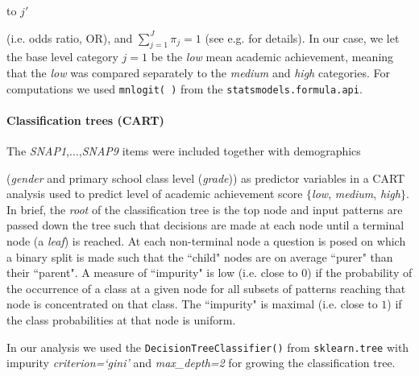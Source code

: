 \documentclass[10pt,letterpaper]{article}
\begin{document}
to $j'$ {(i.e. odds ratio, OR), and $\sum_{j=1}^J \pi_j = 1$ (see e.g. \cite{Bilder2015} for details).
In our case, we let the base level category $j=1$ be the {\it low} mean academic achievement, meaning that the {\it low} was compared separately to 
the {\it medium} and {\it high} categories.
For computations we used  {\tt \small mnlogit( )} from the {\tt \small statsmodels.formula.api}. \\

\vspace{3mm}

\paragraph{Classification trees (CART)}
The {\it SNAP1},$\ldots$,{\it SNAP9} items were included together with demographics {(\emph{gender} and primary school class level ({\it grade})) as predictor variables in a CART analysis \cite{Breiman2001} used to predict level of academic achievement score $\{$\emph{low}, \emph{medium}, \emph{high}$\}$.
In brief, the \emph{root} of the classification tree is the top node and input patterns are passed down the tree such that decisions are made at each node until a terminal 
node (a \emph{leaf}) is reached. At each non-terminal node a question is posed on which a binary split is made such that the ``child" nodes are on average ``purer" than their ``parent". 
A measure of ``impurity" is 
low (i.e. close to $0$) if the probability of the occurrence of a class at a given node for all subsets of patterns reaching that node is concentrated on that class. 
The ``impurity" is maximal (i.e. close to $1$) if the class probabilities at that node is uniform. 
         
In our analysis we used the {\tt \small DecisionTreeClassifier()}  from {\tt \small sklearn.tree} with impurity {\it criterion=`gini'} and {\it max\_depth=2}
for growing the classification tree.

}}
\end{document}
